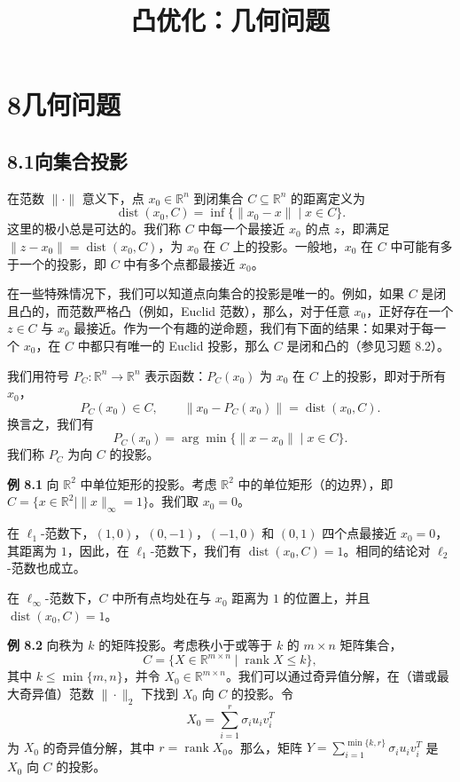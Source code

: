 \documentclass[UTF8,12pt,a4paper,fontset=fandol]{ctexart}
\title{凸优化：几何问题}
\author{}
\date{}
\begin{document}
\maketitle

\section*{8\quad 几何问题}

\subsection*{8.1\quad 向集合投影}

在范数 $\|\cdot\|$ 意义下，点 $x_0\in\mathbb{R}^n$ 到闭集合 $C\subseteq\mathbb{R}^n$ 的距离定义为
\[
\operatorname{dist}(x_0,C)=\inf\{\|x_0-x\|\mid x\in C\}.
\]
这里的极小总是可达的。我们称 $C$ 中每一个最接近 $x_0$ 的点 $z$，即满足 $\|z-x_0\|=\operatorname{dist}(x_0,C)$，为 $x_0$ 在 $C$ 上的投影。一般地，$x_0$ 在 $C$ 中可能有多于一个的投影，即 $C$ 中有多个点都最接近 $x_0$。

在一些特殊情况下，我们可以知道点向集合的投影是唯一的。例如，如果 $C$ 是闭且凸的，而范数严格凸（例如，Euclid 范数），那么，对于任意 $x_0$，正好存在一个 $z\in C$ 与 $x_0$ 最接近。作为一个有趣的逆命题，我们有下面的结果：如果对于每一个 $x_0$，在 $C$ 中都只有唯一的 Euclid 投影，那么 $C$ 是闭和凸的（参见习题 8.2）。

我们用符号 $P_C:\mathbb{R}^n\to\mathbb{R}^n$ 表示函数：$P_C(x_0)$ 为 $x_0$ 在 $C$ 上的投影，即对于所有 $x_0$，
\[
P_C(x_0)\in C,\qquad \|x_0-P_C(x_0)\|=\operatorname{dist}(x_0,C).
\]
换言之，我们有
\[
P_C(x_0)=\arg\min\{\|x-x_0\|\mid x\in C\}.
\]
我们称 $P_C$ 为向 $C$ 的投影。

\noindent\textbf{例 8.1}\quad
向 $\mathbb{R}^2$ 中单位矩形的投影。考虑 $\mathbb{R}^2$ 中的单位矩形（的边界），即 $C=\{x\in\mathbb{R}^2\mid \|x\|_\infty=1\}$。我们取 $x_0=0$。

在 $\ell_1$-范数下，$(1,0)$，$(0,-1)$，$(-1,0)$ 和 $(0,1)$ 四个点最接近 $x_0=0$，其距离为 $1$，因此，在 $\ell_1$-范数下，我们有 $\operatorname{dist}(x_0,C)=1$。相同的结论对 $\ell_2$-范数也成立。

在 $\ell_\infty$-范数下，$C$ 中所有点均处在与 $x_0$ 距离为 $1$ 的位置上，并且 $\operatorname{dist}(x_0,C)=1$。

\noindent\textbf{例 8.2}\quad
向秩为 $k$ 的矩阵投影。考虑秩小于或等于 $k$ 的 $m\times n$ 矩阵集合，
\[
C=\{X\in\mathbb{R}^{m\times n}\mid \operatorname{rank}X\leq k\},
\]
其中 $k\leq \min\{m,n\}$，并令 $X_0\in\mathbb{R}^{m\times n}$。我们可以通过奇异值分解，在（谱或最大奇异值）范数 $\|\cdot\|_2$ 下找到 $X_0$ 向 $C$ 的投影。令
\[
X_0=\sum_{i=1}^r\sigma_i u_i v_i^T
\]
为 $X_0$ 的奇异值分解，其中 $r=\operatorname{rank}X_0$。那么，矩阵 $Y=\sum_{i=1}^{\min\{k,r\}}\sigma_i u_i v_i^T$ 是 $X_0$ 向 $C$ 的投影。
\end{document}
